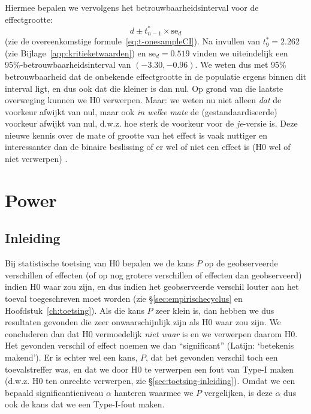\documentclass[
]{book}
\begin{document}
Hiermee bepalen we vervolgens het betrouwbaarheidsinterval voor de
effectgrootte:
\begin{equation}
   \label{eq:d-paired-CI}
    d \pm t^*_{n-1} \times \textrm{se}_d 
\end{equation}
(zie de overeenkomstige
formule~\eqref{eq:t-onesampleCI}).
Na invullen van \(t^*_9=2.262\) (zie
Bijlage~\ref{app:kritieketwaarden}) en \(\textrm{se}_d = 0.519\) vinden we
uiteindelijk een 95\%-betrouwbaarheidsinterval van \((-3.30,-0.96)\). We
weten dus met 95\% betrouwbaarheid dat de onbekende effectgrootte in de
populatie ergens binnen dit interval ligt, en dus ook dat die kleiner is
dan nul. Op grond van die laatste overweging kunnen we H0 verwerpen.
Maar: we weten nu niet alleen \emph{dat} de voorkeur afwijkt van nul, maar
ook \emph{in welke mate} de (gestandaardiseerde) voorkeur afwijkt van nul,
d.w.z. hoe sterk de voorkeur voor de \emph{je}-versie is. Deze nieuwe kennis
over de mate of grootte van het effect is vaak nuttiger en interessanter
dan de binaire beslissing of er wel of niet een effect is (H0 wel of
niet verwerpen) \citep{Cumm12}.

\hypertarget{ch:power}{%
\chapter{Power}\label{ch:power}}

\hypertarget{sec:power-inleiding}{%
\section{Inleiding}\label{sec:power-inleiding}}

Bij statistische toetsing van H0 bepalen we de kans \(P\) op de
geobserveerde verschillen of effecten (of op nog grotere verschillen of
effecten dan geobserveerd) indien H0 waar zou zijn, en dus indien het
geobserveerde verschil louter aan het toeval toegeschreven moet worden
(zie §\ref{sec:empirischecyclus} en
Hoofdstuk~\ref{ch:toetsing}). Als die kans \(P\) zeer klein is, dan hebben we
dus resultaten gevonden die zeer onwaarschijnlijk zijn als H0 waar zou
zijn. We concluderen dan dat H0 vermoedelijk \emph{niet waar} is en we
verwerpen daarom H0. Het gevonden verschil of effect noemen we dan
``significant'' (Latijn: `betekenis makend'). Er is echter wel een kans,
\(P\), dat het gevonden verschil toch een toevalstreffer was, en dat we
door H0 te verwerpen een fout van Type-I maken (d.w.z. H0 ten onrechte
verwerpen, zie
§\ref{sec:toetsing-inleiding}). Omdat we een bepaald
significantieniveau \(\alpha\) hanteren waarmee we \(P\) vergelijken, is
deze \(\alpha\) dus ook de kans dat we een Type-I-fout maken.
\end{document}
